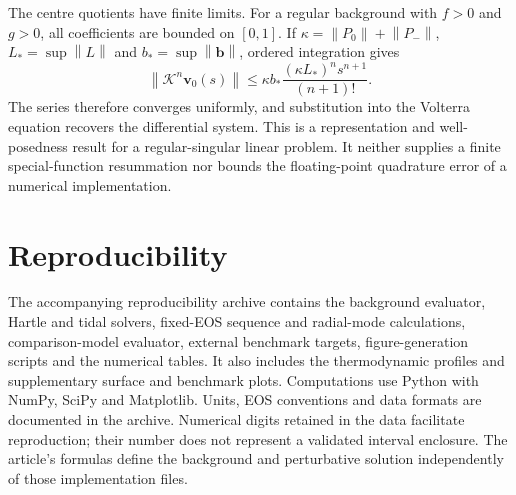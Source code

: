 \documentclass[journal,a4paper]{IEEEtran}
\newcommand{\norm}[1]{\left\|#1\right\|}
\begin{document}
The centre quotients have finite limits. For a regular background with $f>0$ and $g>0$, all coefficients are bounded on $[0,1]$. If $\kappa=\norm{P_0}+\norm{P_-}$, $L_* =\sup\norm L$ and $b_* =\sup\norm{\boldsymbol b}$, ordered integration gives
\begin{equation}
 \norm{\mathcal K^n\boldsymbol v_0(s)}
 \le\kappa b_*\frac{(\kappa L_*)^n s^{n+1}}{(n+1)!}.
\end{equation}
The series therefore converges uniformly, and substitution into the Volterra equation recovers the differential system. This is a representation and well-posedness result for a regular-singular linear problem. It neither supplies a finite special-function resummation nor bounds the floating-point quadrature error of a numerical implementation.

\section{Reproducibility}
The accompanying reproducibility archive contains the background evaluator, Hartle and tidal solvers, fixed-EOS sequence and radial-mode calculations, comparison-model evaluator, external benchmark targets, figure-generation scripts and the numerical tables. It also includes the thermodynamic profiles and supplementary surface and benchmark plots. Computations use Python with NumPy, SciPy and Matplotlib. Units, EOS conventions and data formats are documented in the archive. Numerical digits retained in the data facilitate reproduction; their number does not represent a validated interval enclosure. The article's formulas define the background and perturbative solution independently of those implementation files.
\end{document}

